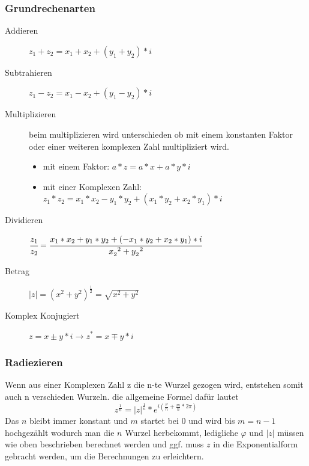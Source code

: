 \documentclass[a4paper]{scrartcl}
\begin{document}
            \subsubsection{Grundrechenarten}
                \begin{description}
                    \item[Addieren] $z_1 + z_2 = x_1 + x_2 + (y_1 + y_2)*i$ 
                    \item[Subtrahieren] $z_1 - z_2 = x_1 - x_2 + (y_1 - y_2)*i$ 
                    \item[Multiplizieren] beim multiplizieren wird unterschieden ob mit einem konstanten Faktor oder einer weiteren komplexen Zahl multipliziert wird.
                    \begin{itemize}
                        \item mit einem Faktor: $a * z = a * x + a * y * i $
                        \item mit einer Komplexen Zahl: $z_1 * z_2 = x_1 * x_2 - y_1 * y_2 + (x_1 * y_2 + x_2 * y_1) * i $
                    \end{itemize}  
                    \item[Dividieren]  $\cfrac{z_1}{z_2} = \cfrac{x_1*x_2 + y_1*y_2 + (-x_1*y_2 + x_2*y_1)*i}{x_2^{\;\;2} + y_2^{\;\;2}}$
                    \item[Betrag] $|z| = (x^2 + y^2)^\frac{1}{2} = \sqrt{x^2 + y^2}$ 
                    \item[Komplex Konjugiert] $z = x \pm y*i \rightarrow z^* = x \mp y*i$ 
                \end{description}
                
            \subsubsection{Radiezieren}
            Wenn aus einer Komplexen Zahl z die n-te Wurzel gezogen wird, entstehen somit auch n verschieden Wurzeln.
            die allgemeine Formel dafür lautet 
            \begin{equation*}
                z^{\frac{1}{n}} = |z|^{\frac{1}{n}} * e^{i(\frac{\varphi}{n} + \frac{m}{n}* 2\pi)}
            \end{equation*}
            Das $n$ bleibt immer konstant und $m$ startet bei 0 und wird bis $m = n-1$ hochgezählt wodurch man die $n$ Wurzel herbekommt,
            ledigliche $\varphi$ und $|z|$ müssen wie oben beschrieben berechnet werden und ggf. muss $z$ in die Exponentialform gebracht werden, um die Berechnungen zu erleichtern.  
        \newpage
\end{document}
